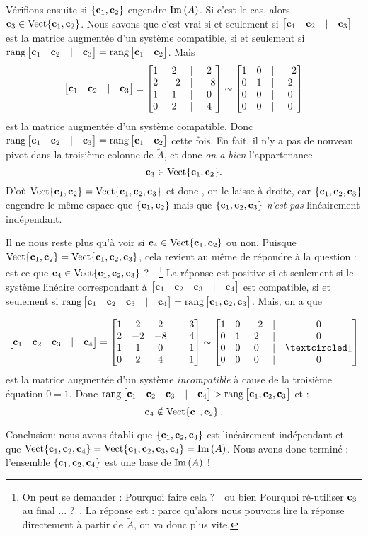 \begin{myprob}
V\'erifions ensuite si $\set{\cc_1, \cc_2}$ engendre $\im(A)$. Si c'est le cas, alors $\cc_3 \in \sp{\cc_1, \cc_2}$. Nous savons que c'est vrai si et seulement si
$\mat{\cc_1&\cc_2&|&\cc_3} $ est la matrice augmentée d'un système compatible, si et seulement si $\rank\mat{\cc_1&\cc_2&|&\cc_3}=\rank\mat{\cc_1&\cc_2}$. Mais
$$ \mat{\cc_1&\cc_2&|&\cc_3}=\mat{
1&2&|&2\\2&-2&|&-8\\1&1&|&0\\0&2&|&4}\sim\mat{1 & 0 &|& -2 \\ 0 & 1 &|& 2 \\ 0 & 0 &|& 0 \\ 0 & 0 &|& 0 }$$ 
est la matrice augmentée d'un système compatible. Donc  $\rank\mat{\cc_1&\cc_2&|&\cc_3}=\rank\mat{\cc_1&\cc_2}$ cette fois. En fait, il n'y a pas de nouveau pivot dans la troisi\`eme colonne de $\tilde A$, et donc {\it on a bien } l'appartenance $$\cc_3 \in \sp{\cc_1, \cc_2}. $$ 
D'où $\sp{\cc_1, \cc_2}=\sp{\cc_1, \cc_2, \cc_3}$ et donc , on le laisse à droite, car $\set{\cc_1, \cc_2, \cc_3}$ engendre le même espace que $\set{\cc_1, \cc_2}$ mais que $\set{\cc_1, \cc_2, \cc_3}$ {\it n'est pas} lin\'eairement indépendant.

Il ne nous reste plus qu'à voir si $\cc_4\in \sp{\cc_1, \cc_2}$ ou non. Puisque $\sp{\cc_1, \cc_2}=\sp{\cc_1, \cc_2, \cc_3}$, cela revient au même de répondre à la question : \og est-ce que $\cc_4\in \sp{\cc_1, \cc_2, \cc_3}$ ?\ \fg\ \footnote{On peut se demander : \og Pourquoi faire cela ?\ \fg\ ou bien \og Pourquoi ré-utiliser $\cc_3$ au final ... ?\ \fg. La r\'eponse est : parce qu'alors nous pouvons lire la réponse directement à partir de $\tilde A$, on va donc plus vite.} La réponse est positive si et seulement si le système linéaire correspondant à $\mat{\cc_1&\cc_2&\cc_3&|&\cc_4}$ est compatible, si et seulement si $\rank\mat{\cc_1&\cc_2&\cc_3&|&\cc_4} =\rank\mat{\cc_1, \cc_2, \cc_3}$. Mais, on a que

$$\mat{\cc_1&\cc_2&\cc_3&|&\cc_4}= \mat{
1&2&2&|&3\\2&-2&-8&|&4\\1&1&0&|&1\\0&2&4&|&1}\sim\mat{1 & 0 & -2 &|& 0\\ 0 & 1 & 2 &|& 0\\ 0 & 0 & 0 &|& \pivot\\ 0 & 0 & 0 &|& 0}$$
 est la matrice augmentée d'un système {\it incompatible} à cause de la troisième équation $0=1$. Donc $\rank\mat{\cc_1&\cc_2&\cc_3&|&\cc_4}>\rank\mat{\cc_1, \cc_2, \cc_3}$ et :  $$\cc_4\notin \sp{\cc_1, \cc_2}\,.$$

Conclusion: nous avons \'etabli que $\set{\cc_1, \cc_2, \cc_4}$ est lin\'eairement indépendant et que $\sp{\cc_1, \cc_2, \cc_4}=\sp{\cc_1, \cc_2, \cc_3, \cc_4}=\im(A)$. Nous avons donc terminé : l'ensemble $\set{\cc_1, \cc_2, \cc_4}$ est une base de $\im(A)$ !
\end{myprob}



